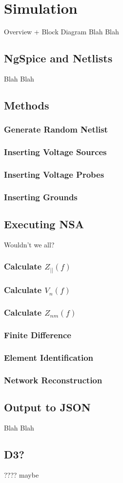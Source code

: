 \chapter{Simulation}

Overview + Block Diagram
Blah Blah

\section{NgSpice and Netlists}

Blah Blah

\section{Methods}
\subsection{Generate Random Netlist}
\subsection{Inserting Voltage Sources}
\subsection{Inserting Voltage Probes}
\subsection{Inserting Grounds}

\section{Executing NSA}
Wouldn't we all?
\subsection{Calculate $Z_{||}(f)$}
\subsection{Calculate $V_n(f)$}
\subsection{Calculate $Z_{nm}(f)$}
\subsection{Finite Difference}
\subsection{Element Identification}
\subsection{Network Reconstruction}

\section{Output to JSON}
Blah Blah

\section{D3?}
???? maybe